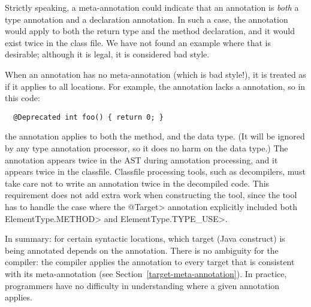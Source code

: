 \documentclass[10pt]{article}
\begin{document}
Strictly speaking, a  meta-annotation could indicate that an
annotation is \emph{both} a type annotation and a declaration annotation.  In
such a case, the annotation would apply to both the return type and the
method declaration, and it would exist twice in the class file.  We have
not found an example where that is desirable; although it is legal, it is
considered bad style.


When an annotation has no  meta-annotation (which is bad
style!), it is treated as if it applies to all locations.
%
For example, the
 annotation lacks a  annotation, so in this
code:

\begin{Verbatim}
  @Deprecated int foo() { return 0; }
\end{Verbatim}

\noindent
the  annotation applies to both the  method,
and the  data type.  (It will be ignored by any type annotation
processor, so it does no harm on the  data type.)  
The  annotation appears twice in the AST during
annotation processing, and it appears twice in the classfile.
Classfile processing tools, such as decompilers, must take care not to
write an annotation twice in the decompiled code.  This requirement does
not add extra work when constructing the tool, since the tool has to handle
the case where the \<@Target> annotation explicitly included both
\<ElementType.METHOD> and \<ElementType.TYPE\_USE>.


In summary:  for certain syntactic locations, which target (Java construct)
is being annotated depends on the annotation.
There is no ambiguity for the compiler:
the compiler applies the annotation to every
target that is consistent with its meta-annotation (see
Section~\ref{target-meta-annotation}).
In practice, programmers
have no difficulty in understanding where a given annotation applies.


\end{document}
